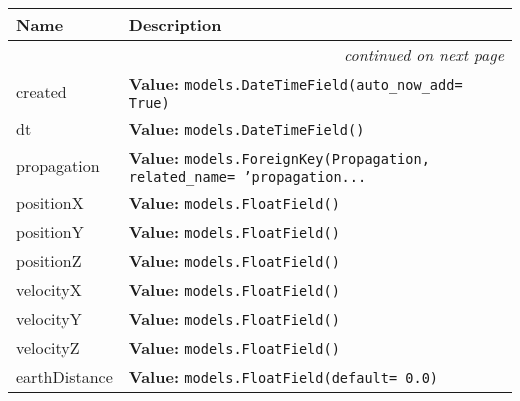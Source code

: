     \vspace{-1cm}
\hspace{\varindent}\begin{longtable}{|p{\varnamewidth}|p{\vardescrwidth}|l}
\cline{1-2}
\cline{1-2} \centering \textbf{Name} & \centering \textbf{Description}& \\
\cline{1-2}
\endhead\cline{1-2}\multicolumn{3}{r}{\small\textit{continued on next page}}\\\endfoot\cline{1-2}
\endlastfoot\raggedright c\-r\-e\-a\-t\-e\-d\- & \raggedright \textbf{Value:} 
{\tt models.DateTimeField(auto\_now\_add= True)}&\\
\cline{1-2}
\raggedright d\-t\- & \raggedright \textbf{Value:} 
{\tt models.DateTimeField()}&\\
\cline{1-2}
\raggedright p\-r\-o\-p\-a\-g\-a\-t\-i\-o\-n\- & \raggedright \textbf{Value:} 
{\tt models.ForeignKey(Propagation, related\_name= 'propagation\texttt{...}}&\\
\cline{1-2}
\raggedright p\-o\-s\-i\-t\-i\-o\-n\-X\- & \raggedright \textbf{Value:} 
{\tt models.FloatField()}&\\
\cline{1-2}
\raggedright p\-o\-s\-i\-t\-i\-o\-n\-Y\- & \raggedright \textbf{Value:} 
{\tt models.FloatField()}&\\
\cline{1-2}
\raggedright p\-o\-s\-i\-t\-i\-o\-n\-Z\- & \raggedright \textbf{Value:} 
{\tt models.FloatField()}&\\
\cline{1-2}
\raggedright v\-e\-l\-o\-c\-i\-t\-y\-X\- & \raggedright \textbf{Value:} 
{\tt models.FloatField()}&\\
\cline{1-2}
\raggedright v\-e\-l\-o\-c\-i\-t\-y\-Y\- & \raggedright \textbf{Value:} 
{\tt models.FloatField()}&\\
\cline{1-2}
\raggedright v\-e\-l\-o\-c\-i\-t\-y\-Z\- & \raggedright \textbf{Value:} 
{\tt models.FloatField()}&\\
\cline{1-2}
\raggedright e\-a\-r\-t\-h\-D\-i\-s\-t\-a\-n\-c\-e\- & \raggedright \textbf{Value:} 
{\tt models.FloatField(default= 0.0)}&\\
\cline{1-2}
\end{longtable}

